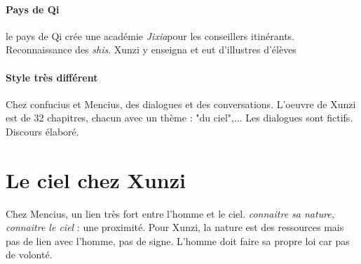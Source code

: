 \paragraph{Pays de Qi} le pays de Qi crée une académie  \textit{Jixia}pour les conseillers itinérants. Reconnaissance des \textit{shis}. Xunzi y enseigna et eut d'illustres d'élèves




\paragraph{Style très différent} Chez confucius et Mencius, des dialogues et des conversations. L'oeuvre de Xunzi est de 32 chapitres, chacun avec un thème : "du ciel",... Les dialogues sont fictifs. Discours élaboré.

\section{Le ciel chez Xunzi}

\begin{Prop}
    Chez Mencius, un lien très fort entre l'homme et le ciel. \textit{connaitre sa nature, connaitre le ciel} : une proximité. 
    Pour Xunzi, la nature est des ressources mais pas de lien avec l'homme, pas de signe. L'homme doit faire sa propre loi car pas de volonté.
\end{Prop}


